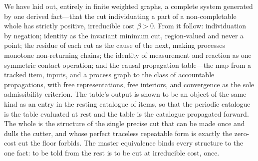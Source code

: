 \documentclass[11pt,twocolumn,a4paper]{article}
\theoremstyle{thmstyle}
\theoremstyle{definition}
\theoremstyle{remark}
\newcommand{\flo}{\beta}                 %
\begin{document}
We have laid out, entirely in finite weighted graphs, a complete system
generated by one derived fact---that the cut individuating a part of a
non-completable whole has strictly positive, irreducible cost $\flo>0$.
From it follow: individuation by negation; identity as the invariant
minimum cut, region-valued and never a point; the residue of each cut as
the cause of the next, making processes monotone non-returning chains; the
identity of measurement and reaction as one symmetric contact operation;
and the causal propagation table---the map from a tracked item, inputs, and
a process graph to the class of accountable propagations, with free
representations, free interiors, and convergence as the sole admissibility
criterion. The table's output is shown to be an object of the same kind as
an entry in the resting catalogue of items, so that the periodic catalogue
is the table evaluated at rest and the table is the catalogue propagated
forward. The whole is the structure of the single precise cut that can be
made once and dulls the cutter, and whose perfect traceless repeatable form
is exactly the zero-cost cut the floor forbids. The master equivalence
binds every structure to the one fact: to be told from the rest is to be
cut at irreducible cost, once.



\end{document}
